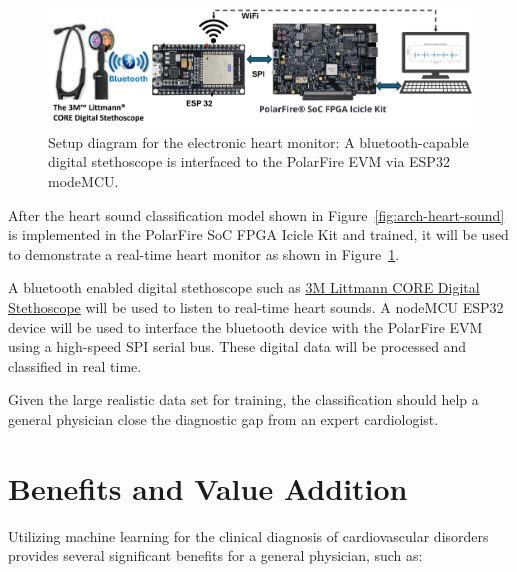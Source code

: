 \documentclass[12pt]{article}
\begin{document}
\begin{figure}[htbp]	
    \includegraphics[width=1.0\textwidth]{figs/HW-setup.png}
    \caption{Setup diagram for the electronic heart monitor: A bluetooth-capable digital stethoscope is interfaced to the PolarFire EVM via ESP32 modeMCU.}
    \label{fig:hw-setup}
\end{figure}

After the heart sound classification model shown in Figure~\ref{fig:arch-heart-sound} is implemented in the PolarFire SoC FPGA Icicle Kit and trained, it will be used to demonstrate a real-time heart monitor as shown in Figure~\ref{fig:hw-setup}.

A bluetooth enabled digital stethoscope such as \href{https://www.littmann.com/3M/en_US/littmann-stethoscopes/advantages/core-digital-stethoscope/}{3M Littmann CORE Digital Stethoscope} will be used to listen to real-time heart sounds. A nodeMCU ESP32 device will be used to interface the bluetooth device with the PolarFire EVM using a high-speed SPI serial bus. These digital data will be processed and classified in real time.

Given the large realistic data set for training, the classification should help a general physician close the diagnostic gap from an expert cardiologist. 

\section{Benefits and Value Addition}

Utilizing machine learning for the clinical diagnosis of cardiovascular disorders provides several significant benefits for a general physician, such as:
\end{document}
